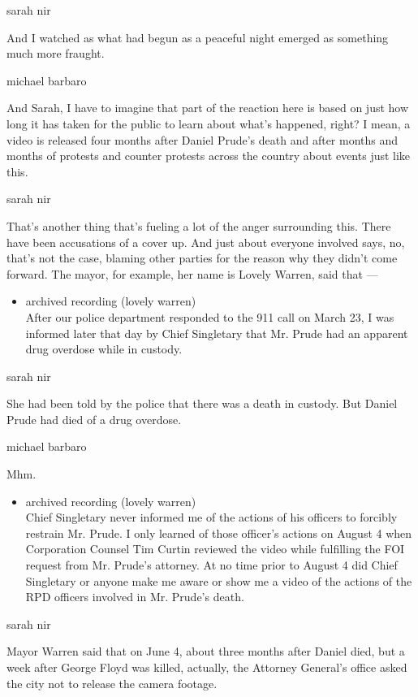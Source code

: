 sarah nir

And I watched as what had begun as a peaceful night emerged as something
much more fraught.

michael barbaro

And Sarah, I have to imagine that part of the reaction here is based on
just how long it has taken for the public to learn about what's
happened, right? I mean, a video is released four months after Daniel
Prude's death and after months and months of protests and counter
protests across the country about events just like this.

sarah nir

That's another thing that's fueling a lot of the anger surrounding this.
There have been accusations of a cover up. And just about everyone
involved says, no, that's not the case, blaming other parties for the
reason why they didn't come forward. The mayor, for example, her name is
Lovely Warren, said that ---

\begin{itemize}
\tightlist
\item
  archived recording (lovely warren)\\
  After our police department responded to the 911 call on March 23, I
  was informed later that day by Chief Singletary that Mr. Prude had an
  apparent drug overdose while in custody.
\end{itemize}

sarah nir

She had been told by the police that there was a death in custody. But
Daniel Prude had died of a drug overdose.

michael barbaro

Mhm.

\begin{itemize}
\tightlist
\item
  archived recording (lovely warren)\\
  Chief Singletary never informed me of the actions of his officers to
  forcibly restrain Mr. Prude. I only learned of those officer's actions
  on August 4 when Corporation Counsel Tim Curtin reviewed the video
  while fulfilling the FOI request from Mr. Prude's attorney. At no time
  prior to August 4 did Chief Singletary or anyone make me aware or show
  me a video of the actions of the RPD officers involved in Mr. Prude's
  death.
\end{itemize}

sarah nir

Mayor Warren said that on June 4, about three months after Daniel died,
but a week after George Floyd was killed, actually, the Attorney
General's office asked the city not to release the camera footage.

